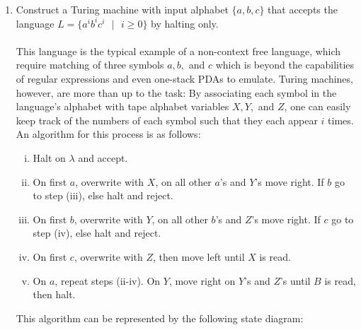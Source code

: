 \documentclass[12pt]{article}
\begin{document}
\begin{enumerate}
\begin{center}
    \end{center}

\newpage

  \item Construct a Turing machine with input alphabet $\{a,b,c\}$ that accepts the language $L = \{a^ib^ic^i \text{ }|\text{ } i \ge 0\}$ by halting only. \\ \\
    This language is the typical example of a non-context free language, which require matching of three symbols $a,b,$ and $c$ which is beyond the capabilities of regular expressions and even one-stack PDAs to emulate. Turing machines, however, are more than up to the task: By associating each symbol in the language's alphabet with tape alphabet variables $X,Y,$ and $Z$, one can easily keep track of the numbers of each symbol such that they each appear $i$ times. An algorithm for this process is as follows:
    \begin{enumerate}[i.]
    \item Halt on $\lambda$ and accept.
    \item On first $a$, overwrite with $X$, on all other $a$'s and $Y$'s move right. If $b$ go to step (iii), else halt and reject.
    \item On first $b$, overwrite with $Y$, on all other $b$'s and $Z$'s move right. If $c$ go to step (iv), else halt and reject.
    \item On first $c$, overwrite with $Z$, then move left until $X$ is read. 
    \item On $a$, repeat steps (ii-iv). On $Y$, move right on $Y$'s and $Z$'s until $B$ is read, then halt.
    \end{enumerate}
    
    This algorithm can be represented by the following state diagram:
    \begin{center}
\end{center}
\end{enumerate}
\end{document}
